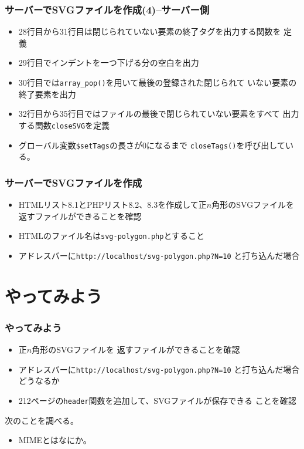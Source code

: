 \begin{frame}[containsverbatim]
 \frametitle{サーバーでSVGファイルを作成(4)--サーバー側}
\begin{itemize}
 \item 28行目から31行目は閉じられていない要素の終了タグを出力する関数を
       定義
 \item 29行目でインデントを一つ下げる分の空白を出力
 \item 30行目では\texttt{array\_pop()}を用いて最後の登録された閉じられて
       いない要素の終了要素を出力
 \item 32行目から35行目ではファイルの最後で閉じられていない要素をすべて
       出力する関数\texttt{closeSVG}を定義
 \item グローバル変数\texttt{\$setTags}の長さが0になるまで
       \texttt{closeTags()}を呼び出している。
\end{itemize}
\end{frame}
\begin{frame}[containsverbatim]
 \frametitle{サーバーでSVGファイルを作成}
 \begin{itemize}
  \item HTMLリスト8.1とPHPリスト8.2、8.3を作成して正$n$角形のSVGファイルを
        返すファイルができることを確認
  \item HTMLのファイル名は\texttt{svg-polygon.php}とすること
  \item アドレスバーに\verb+http://localhost/svg-polygon.php?N=10+
と打ち込んだ場合
 \end{itemize}
\end{frame}
\section{やってみよう}
\begin{frame}[containsverbatim]
 \frametitle{やってみよう}
 \begin{itemize}
  \item 正$n$角形のSVGファイルを
      返すファイルができることを確認
  \item アドレスバーに\Verb+http://localhost/svg-polygon.php?N=10+
と打ち込んだ場合どうなるか
  \item 212ページの\texttt{header}関数を追加して、SVGファイルが保存できる
       ことを確認
 \end{itemize}
 次のことを調べる。
 \begin{itemize}
  \item MIMEとはなにか。
 \end{itemize}
\end{frame}

\begin{frame}[containsverbatim]
 \frametitle{}
\end{frame}
